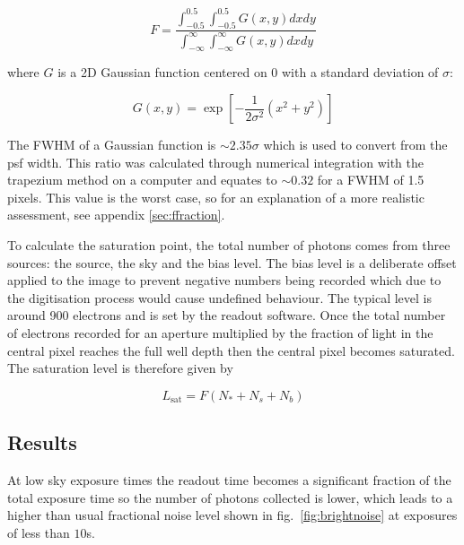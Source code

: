 \documentclass[11pt,a4paper]{report}
\begin{document}
\[
    F = \frac{\int_{-0.5}^{0.5}\int_{-0.5}^{0.5} G(x,y) dx dy}
    {\int_{-\infty}^{\infty}\int_{-\infty}^{\infty} G(x,y) dx dy}
    \]

where $G$ is a 2D Gaussian function centered on $0$ with a standard
deviation of $\sigma$:  


\[
G(x,y) = \exp \left[
		-\frac{1}{2\sigma^{2}} \left(
			x^{2} + y^{2}
		\right)
	\right]
\]

The FWHM of a Gaussian function is $\sim 2.35 \sigma$ which is used to
convert from the psf width. This ratio was calculated through numerical
integration with the trapezium method on a computer and equates to $\sim
0.32$ for a FWHM of 1.5 pixels. This value is the worst case, so for an
explanation of a more realistic assessment, see appendix \ref{sec:ffraction}.


To calculate the saturation point, the total number of photons comes
from three sources: the source, the sky and the bias level. The bias
level is a deliberate offset applied to the image to prevent negative
numbers being recorded which due to the digitisation process would cause
undefined behaviour. The typical level is around 900 electrons and is
set by the readout software. Once the total number of electrons recorded
for an aperture multiplied by the fraction of light in the central pixel
reaches the full well depth then the central pixel becomes saturated.
The saturation level is therefore given by

\[
    L_{\mathrm{sat}} = F  (N_{\ast} + N_{s} + N_{b})
    \]



\subsection{Results}

At low sky exposure times the readout time becomes a significant fraction of the total exposure time so the number of photons collected is lower, which leads to a higher than usual fractional noise level shown in fig.~\ref{fig:brightnoise} at exposures of less than $10$s.
\end{document}
